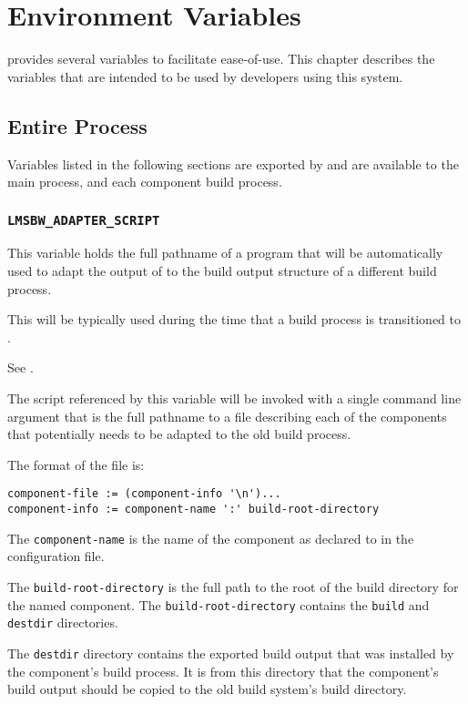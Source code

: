 \chapter{Environment Variables}

\lmsbw provides several variables to facilitate ease-of-use.  This
chapter describes the variables that are intended to be used by
developers using this system.

\section{Entire \lmsbw Process}

Variables listed in the following sections are exported by \lmsbwcmd
and are available to the main \lmsbw process, and each component build
process.

\subsection{\texttt{LMSBW\_ADAPTER\_SCRIPT}}\label{envvar:lmsbw-adapter-script}

This variable holds the full pathname of a program that will be
automatically used to adapt the output of \lmsbw to the build output
structure of a different build process.

This will be typically used during the time that a build process is
transitioned to \lmsbw.

See .

The script referenced by this variable will be invoked with a single
command line argument that is the full pathname to a file describing
each of the components that potentially needs to be adapted to the old
build process.

The format of the file is:

\begin{verbatim}
component-file := (component-info '\n')...
component-info := component-name ':' build-root-directory
\end{verbatim}

The \texttt{component-name} is the name of the component as declared
to \lmsbw in the configuration file.

The \texttt{build-root-directory} is the full path to the root of the
build directory for the named component.  The
\texttt{build-root-directory} contains the \texttt{build} and
\texttt{destdir} directories.

The \texttt{destdir} directory contains the exported build output that
was installed by the component's build process.  It is from this
directory that the component's build output should be copied to the
old build system's build directory.

